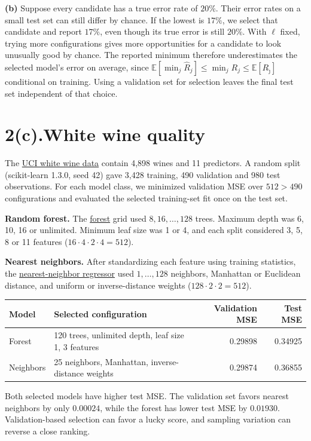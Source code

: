 \documentclass[11pt,letterpaper]{article}
\newcommand{\subpart}[1]{\textbf{(#1)}\enspace}
\newcommand{\E}{\mathbb{E}}
\newcommand{\Rhat}{\widehat R}
\begin{document}
\subpart{b} Suppose every candidate has a true error rate of $20\%$. Their
error rates on a small test set can still differ by chance. If the lowest is
$17\%$, we select that candidate and report $17\%$, even though its true
error is still $20\%$. With $\ell$ fixed, trying more configurations gives
more opportunities for a candidate to look unusually good by chance.
The reported minimum therefore underestimates the selected model's error on
average, since $\E[\min_j\Rhat_j]\le\min_j R_j\le\E[R_{\hat\jmath}]$
conditional on training.
Using a validation set for selection leaves the final test set independent
of that choice.

\newpage
\section*{2(c).\quad White wine quality}
The \href{https://archive.ics.uci.edu/dataset/186/wine+quality}{UCI white wine
data} contain 4,898 wines and 11 predictors. A random split (scikit-learn
1.3.0, seed 42) gave
3,428 training, 490 validation and 980 test observations. For each model
class, we minimized validation MSE over $512>490$ configurations and
evaluated the selected training-set fit once on the test set.

\textbf{Random forest.}
The \href{https://scikit-learn.org/stable/modules/generated/sklearn.ensemble.RandomForestRegressor.html}{forest}
grid used $8,16,\ldots,128$ trees. Maximum depth was 6, 10, 16 or unlimited.
Minimum leaf size was 1 or 4, and each split considered 3, 5, 8 or 11 features
($16\cdot4\cdot2\cdot4=512$).

\textbf{Nearest neighbors.}
After standardizing each feature using training statistics, the
\href{https://scikit-learn.org/stable/modules/generated/sklearn.neighbors.KNeighborsRegressor.html}{nearest-neighbor regressor}
used $1,\ldots,128$ neighbors, Manhattan or Euclidean distance, and uniform
or inverse-distance weights ($128\cdot2\cdot2=512$).

\begin{center}
\begin{tabular}{llrr}
\toprule
Model & Selected configuration & Validation MSE & Test MSE\\
\midrule
Forest & 120 trees, unlimited depth, leaf size 1, 3 features & 0.29898 & 0.34925\\
Neighbors & 25 neighbors, Manhattan, inverse-distance weights & 0.29874 & 0.36855\\
\bottomrule
\end{tabular}
\end{center}
Both selected models have higher test MSE. The validation set favors nearest
neighbors by only $0.00024$, while the forest has lower test MSE by $0.01930$.
Validation-based selection can favor a lucky score, and sampling variation
can reverse a close ranking.
\end{document}
